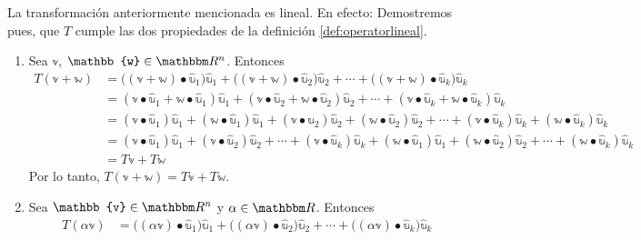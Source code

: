 \begin{observation}
    La transformación anteriormente mencionada es lineal. En efecto: Demostremos pues, que $T$ cumple las dos propiedades de la definición \ref{def:operatorlineal}.
    \begin{enumerate}[label=\roman*)]
        \item Sea $\mathbb{v}$, $\mathbb{w} \in \RR[n]$. Entonces
        \begin{align*}
            T(\mathbb{v} + \mathbb{w}) & = \big((\mathbb{v} + \mathbb{w}) \bullet \hat{\mathbb{u}}_1\big)\hat{\mathbb{u}}_1 + \big((\mathbb{v} + \mathbb{w}) \bullet \hat{\mathbb{u}}_2\big)\hat{\mathbb{u}}_2 + \cdots + \big((\mathbb{v} + \mathbb{w}) \bullet \hat{\mathbb{u}}_k\big)\hat{\mathbb{u}}_k \\
            & = (\mathbb{v} \bullet \hat{\mathbb{u}}_1 + \mathbb{w} \bullet \hat{\mathbb{u}}_1)\hat{\mathbb{u}}_1 + (\mathbb{v} \bullet \hat{\mathbb{u}}_2 + \mathbb{w} \bullet \hat{\mathbb{u}}_2)\hat{\mathbb{u}}_2 + \cdots + (\mathbb{v} \bullet \hat{\mathbb{u}}_k + \mathbb{w} \bullet \hat{\mathbb{u}}_k)\hat{\mathbb{u}}_k \\
            & = (\mathbb{v} \bullet \hat{\mathbb{u}}_1)\hat{\mathbb{u}}_1 + (\mathbb{w} \bullet \hat{\mathbb{u}}_1)\hat{\mathbb{u}}_1 + (\mathbb{v} \bullet \hat{\mathbb{u}}_2)\hat{\mathbb{u}}_2 + (\mathbb{w} \bullet \hat{\mathbb{u}}_2)\hat{\mathbb{u}}_2 + \cdots + (\mathbb{v} \bullet \hat{\mathbb{u}}_k)\hat{\mathbb{u}}_k + (\mathbb{w} \bullet \hat{\mathbb{u}}_k)\hat{\mathbb{u}}_k \\
            & = (\mathbb{v} \bullet \hat{\mathbb{u}}_1)\hat{\mathbb{u}}_1 + (\mathbb{v} \bullet \hat{\mathbb{u}}_2)\hat{\mathbb{u}}_2 + \cdots + (\mathbb{v} \bullet \hat{\mathbb{u}}_k)\hat{\mathbb{u}}_k + (\mathbb{w} \bullet \hat{\mathbb{u}}_1)\hat{\mathbb{u}}_1 + (\mathbb{w} \bullet \hat{\mathbb{u}}_2)\hat{\mathbb{u}}_2 + \cdots + (\mathbb{w} \bullet \hat{\mathbb{u}}_k)\hat{\mathbb{u}}_k \\
            & = T\mathbb{v} + T\mathbb{w}
        \end{align*}
        Por lo tanto, $T(\mathbb{v} + \mathbb{w}) = T\mathbb{v} + T\mathbb{w}$.
        \item Sea $\mathbb{v} \in \RR[n]$ y $\alpha \in \RR$. Entonces
        \begin{align*}
            T(\alpha \mathbb{v}) & = \big((\alpha \mathbb{v}) \bullet \hat{\mathbb{u}}_1\big)\hat{\mathbb{u}}_1 + \big((\alpha \mathbb{v}) \bullet \hat{\mathbb{u}}_2\big)\hat{\mathbb{u}}_2 + \cdots + \big((\alpha \mathbb{v}) \bullet \hat{\mathbb{u}}_k\big)\hat{\mathbb{u}}_k \\

\end{align*}
\end{enumerate}
\end{observation}
